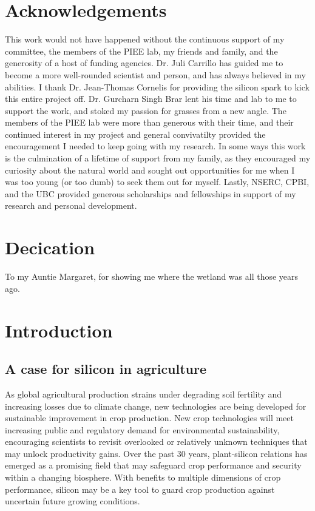 \documentclass[12pt, letterpaper, ]{report}
\begin{document}
\chapter*{Acknowledgements}

This work would not have happened without the continuous support of my committee, the members of the PIEE lab, my friends and family, and the generosity of a host of funding agencies. Dr. Juli Carrillo has guided me to become a more well-rounded scientist and person, and has always believed in my abilities. I thank Dr. Jean-Thomas Cornelis for providing the silicon spark to kick this entire project off. Dr. Gurcharn Singh Brar lent his time and lab to me to support the work, and stoked my passion for grasses from a new angle. The members of the PIEE lab were more than generous with their time, and their continued interest in my project and general convivatilty provided the encouragement I needed to keep going with my research. In some ways this work is the culmination of a lifetime of support from my family, as they encouraged my curiosity about the natural world and sought out opportunities for me when I was too young (or too dumb) to seek them out for myself. Lastly, NSERC, CPBI, and the UBC provided generous scholarships and fellowships in support of my research and personal development.

\chapter*{Decication}

To my Auntie Margaret, for showing me where the wetland was all those years ago.

\chapter{Introduction}

\section{A case for silicon in agriculture}

As global agricultural production strains under degrading soil fertility and increasing losses due to climate change, new technologies are being developed for sustainable improvement in crop production. New crop technologies will meet increasing public and regulatory demand for environmental sustainability, encouraging scientists to revisit overlooked or relatively unknown techniques that may unlock productivity gains. Over the past 30 years, plant-silicon relations has emerged as a promising field that may safeguard crop performance and security within a changing biosphere. With benefits to multiple dimensions of crop performance, silicon may be a key tool to guard crop production against uncertain future growing conditions. 
\end{document}
